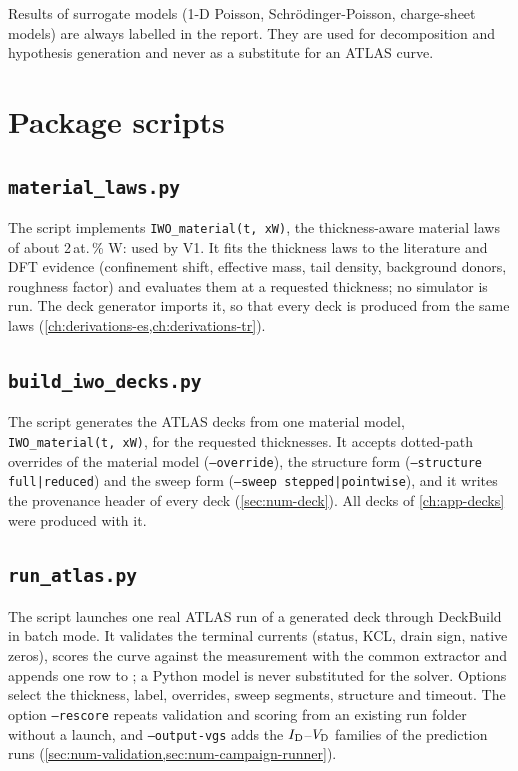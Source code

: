 Results of surrogate models (1-D Poisson, Schr\"odinger-Poisson, charge-sheet models) are always labelled \evSURR{} in the
report. They are used for decomposition and hypothesis generation and never as a substitute for an ATLAS curve.

\section{Package scripts}\label{sec:code-package}

\subsection{\texttt{material\_laws.py}}
The script implements \texttt{IWO\_material(t, xW)}, the thickness-aware material laws of about 2\,at.\,\% W:\InO{} used
by V1. It fits the thickness laws to the literature and DFT evidence (confinement shift, effective mass, tail density,
background donors, roughness factor) and evaluates them at a requested thickness; no simulator is run. The deck generator
imports it, so that every deck is produced from the same laws (\cref{ch:derivations-es,ch:derivations-tr}).


\subsection{\texttt{build\_iwo\_decks.py}}
The script generates the ATLAS decks from one material model, \texttt{IWO\_material(t, xW)}, for the requested
thicknesses. It accepts dotted-path overrides of the material model (\texttt{--override}), the structure form
(\texttt{--structure full|reduced}) and the sweep form (\texttt{--sweep stepped|pointwise}), and it writes the provenance
header of every deck (\cref{sec:num-deck}). All decks of \cref{ch:app-decks} were produced with it.


\subsection{\texttt{run\_atlas.py}}
The script launches one real ATLAS run of a generated deck through DeckBuild in batch mode. It validates the terminal
currents (status, KCL, drain sign, native zeros), scores the curve against the measurement with the common extractor and
appends one row to ; a Python model is never substituted for the solver. Options select the
thickness, label, overrides, sweep segments, structure and timeout. The option \texttt{--rescore} repeats validation and
scoring from an existing run folder without a launch, and \texttt{--output-vgs} adds the $I_{\mathrm{D}}$--$V_{\mathrm{D}}$ families of the
prediction runs (\cref{sec:num-validation,sec:num-campaign-runner}).


